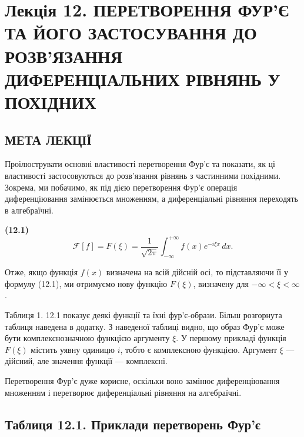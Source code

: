 \section{Лекція 12. ПЕРЕТВОРЕННЯ ФУР'Є ТА ЙОГО ЗАСТОСУВАННЯ ДО РОЗВ'ЯЗАННЯ ДИФЕРЕНЦІАЛЬНИХ РІВНЯНЬ У ПОХІДНИХ}\label{ux43bux435ux43aux446ux456ux44f-12.-ux43fux435ux440ux435ux442ux432ux43eux440ux435ux43dux43dux44f-ux444ux443ux440ux454-ux442ux430-ux439ux43eux433ux43e-ux437ux430ux441ux442ux43eux441ux443ux432ux430ux43dux43dux44f-ux434ux43e-ux440ux43eux437ux432ux44fux437ux430ux43dux43dux44f-ux434ux438ux444ux435ux440ux435ux43dux446ux456ux430ux43bux44cux43dux438ux445-ux440ux456ux432ux43dux44fux43dux44c-ux443-ux43fux43eux445ux456ux434ux43dux438ux445}

\subsection{МЕТА ЛЕКЦІЇ}\label{ux43cux435ux442ux430-ux43bux435ux43aux446ux456ux457}

Проілюструвати основні властивості перетворення Фур'є та показати, як ці властивості застосовуються до розв'язання рівнянь з частинними похідними. Зокрема, ми побачимо, як під дією перетворення Фур'є операція диференціювання замінюється множенням, а диференціальні рівняння переходять в алгебраїчні.

\textbf{(12.1)} \[
\mathcal{F}[f] = F(\xi) = \frac{1}{\sqrt{2\pi}} \int_{-\infty}^{+\infty} f(x)e^{-i\xi x}\,dx.
\]

Отже, якщо функція \(f(x)\) визначена на всій дійсній осі, то підставляючи її у формулу (12.1), ми отримуємо нову функцію \(F(\xi)\), визначену для \(-\infty < \xi < \infty\).

Таблиця 1. 12.1 показує деякі функції та їхні фур'є-образи. Більш розгорнута таблиця наведена в додатку. З наведеної таблиці видно, що образ Фур'є може бути комплекснозначною функцією аргументу \(\xi\). У першому прикладі функція \(F(\xi)\) містить уявну одиницю \(i\), тобто є комплексною функцією. Аргумент \(\xi\) --- дійсний, але значення функції --- комплексні.

Перетворення Фур'є дуже корисне, оскільки воно замінює диференціювання множенням і перетворює диференціальні рівняння на алгебраїчні.

\subsection{Таблиця 12.1. Приклади перетворень Фур'є}\label{ux442ux430ux431ux43bux438ux446ux44f-12.1.-ux43fux440ux438ux43aux43bux430ux434ux438-ux43fux435ux440ux435ux442ux432ux43eux440ux435ux43dux44c-ux444ux443ux440ux454}

